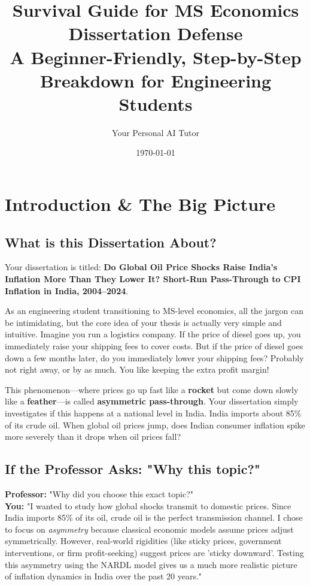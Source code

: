 \documentclass[12pt,a4paper]{report}
\title{\textbf{Survival Guide for MS Economics Dissertation Defense}\\
\large A Beginner-Friendly, Step-by-Step Breakdown for Engineering Students}
\author{Your Personal AI Tutor}
\date{\today}
\begin{document}
\maketitle
\tableofcontents
\newpage

\chapter{Introduction \& The Big Picture}
\section{What is this Dissertation About?}
Your dissertation is titled: \textbf{Do Global Oil Price Shocks Raise India's Inflation More Than They Lower It? Short-Run Pass-Through to CPI Inflation in India, 2004--2024}. 

As an engineering student transitioning to MS-level economics, all the jargon can be intimidating, but the core idea of your thesis is actually very simple and intuitive. Imagine you run a logistics company. If the price of diesel goes up, you immediately raise your shipping fees to cover costs. But if the price of diesel goes down a few months later, do you immediately lower your shipping fees? Probably not right away, or by as much. You like keeping the extra profit margin! 

This phenomenon—where prices go up fast like a \textbf{rocket} but come down slowly like a \textbf{feather}—is called \textbf{asymmetric pass-through}. Your dissertation simply investigates if this happens at a national level in India. India imports about 85\% of its crude oil. When global oil prices jump, does Indian consumer inflation spike more severely than it drops when oil prices fall? 

\section{If the Professor Asks: "Why this topic?"}
\textbf{Professor:} "Why did you choose this exact topic?" \\
\textbf{You:} "I wanted to study how global shocks transmit to domestic prices. Since India imports 85\% of its oil, crude oil is the perfect transmission channel. I chose to focus on \textit{asymmetry} because classical economic models assume prices adjust symmetrically. However, real-world rigidities (like sticky prices, government interventions, or firm profit-seeking) suggest prices are 'sticky downward'. Testing this asymmetry using the NARDL model gives us a much more realistic picture of inflation dynamics in India over the past 20 years."
\end{document}
